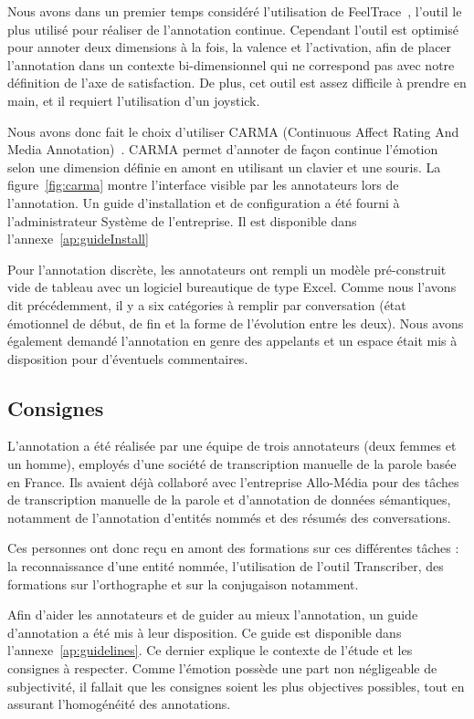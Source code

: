Nous avons dans un premier temps considéré l'utilisation de FeelTrace~\cite{Cowie2000}, l'outil le plus utilisé pour réaliser de l'annotation continue. Cependant l’outil est optimisé pour annoter deux dimensions à la fois, la valence et l'activation, afin de placer l'annotation dans un contexte bi-dimensionnel qui ne correspond pas avec notre définition de l'axe de satisfaction. De plus, cet outil est assez difficile à prendre en main, et il requiert l'utilisation d'un joystick.

Nous avons donc fait le choix d’utiliser CARMA (Continuous Affect Rating And Media Annotation)~\cite{Girard2014}. CARMA permet d'annoter de façon continue l'émotion selon une dimension définie en amont en utilisant un clavier et une souris. La figure~\ref{fig:carma} montre l'interface visible par les annotateurs lors de l'annotation. Un guide d'installation et de configuration a été fourni à l'administrateur Système de l'entreprise. Il est disponible dans l'annexe~\ref{ap:guideInstall}



Pour l'annotation discrète, les annotateurs ont rempli un modèle pré-construit vide de tableau avec un logiciel bureautique de type Excel. Comme nous l'avons dit précédemment, il y a six catégories à remplir par conversation (état émotionnel de début, de fin et la forme de l'évolution entre les deux). Nous avons également demandé l'annotation en genre des appelants et un espace était mis à disposition pour d'éventuels commentaires.

\subsection{Consignes}

L'annotation a été réalisée par une équipe de trois annotateurs (deux femmes et un homme), employés d'une société de transcription manuelle de la parole basée en France. Ils avaient déjà collaboré avec l'entreprise Allo-Média pour des tâches de transcription manuelle de la parole et d'annotation de données sémantiques, notamment de l'annotation d'entités nommés et des résumés des conversations.

Ces personnes ont donc reçu en amont des formations sur ces différentes tâches : la reconnaissance d'une entité nommée, l'utilisation de l’outil Transcriber, des formations sur l’orthographe et sur la conjugaison notamment.

Afin d'aider les annotateurs et de guider au mieux l'annotation, un guide d'annotation a été mis à leur disposition. Ce guide est disponible dans l'annexe~\ref{ap:guidelines}. Ce dernier explique le contexte de l'étude et les consignes à respecter. Comme l'émotion possède une part non négligeable de subjectivité, il fallait que les consignes soient les plus objectives possibles, tout en assurant l'homogénéité des annotations.

